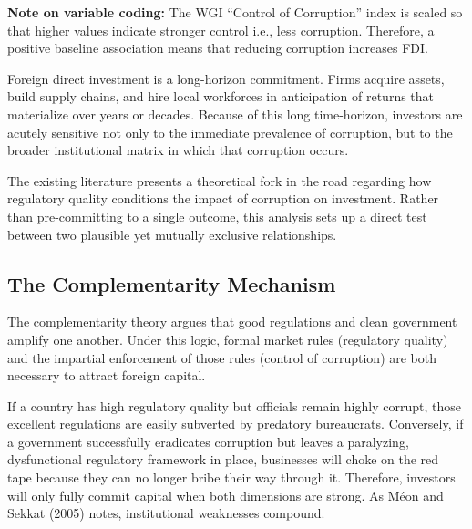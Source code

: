 \documentclass[
  12pt,
  letterpaper,
  DIV=11,
  numbers=noendperiod]{scrartcl}
\begin{document}
\begin{tcolorbox}[enhanced jigsaw, bottomrule=.15mm, opacitybacktitle=0.6, arc=.35mm, toptitle=1mm, leftrule=.75mm, rightrule=.15mm, colframe=quarto-callout-note-color-frame, toprule=.15mm, colback=white, title=\textcolor{quarto-callout-note-color}{\faInfo}\hspace{0.5em}{Note}, colbacktitle=quarto-callout-note-color!10!white, titlerule=0mm, bottomtitle=1mm, left=2mm, opacityback=0, coltitle=black, breakable]

\textbf{Note on variable coding:} The WGI ``Control of Corruption''
index is scaled so that higher values indicate stronger control i.e.,
less corruption. Therefore, a positive baseline association means that
reducing corruption increases FDI.

\end{tcolorbox}

Foreign direct investment is a long-horizon commitment. Firms acquire
assets, build supply chains, and hire local workforces in anticipation
of returns that materialize over years or decades. Because of this long
time-horizon, investors are acutely sensitive not only to the immediate
prevalence of corruption, but to the broader institutional matrix in
which that corruption occurs.

The existing literature presents a theoretical fork in the road
regarding how regulatory quality conditions the impact of corruption on
investment. Rather than pre-committing to a single outcome, this
analysis sets up a direct test between two plausible yet mutually
exclusive relationships.

\subsection{The Complementarity
Mechanism}\label{the-complementarity-mechanism}

The complementarity theory argues that good regulations and clean
government amplify one another. Under this logic, formal market rules
(regulatory quality) and the impartial enforcement of those rules
(control of corruption) are both necessary to attract foreign capital.

If a country has high regulatory quality but officials remain highly
corrupt, those excellent regulations are easily subverted by predatory
bureaucrats. Conversely, if a government successfully eradicates
corruption but leaves a paralyzing, dysfunctional regulatory framework
in place, businesses will choke on the red tape because they can no
longer bribe their way through it. Therefore, investors will only fully
commit capital when both dimensions are strong. As Méon and Sekkat
(2005) notes, institutional weaknesses compound.
\end{document}
